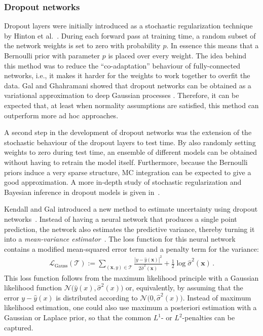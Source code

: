 \documentclass[smallcondensed]{svjour3}
\begin{document}
\subsubsection*{Dropout networks}

    Dropout layers were initially introduced as a stochastic regularization technique by Hinton et al.~\cite{srivastava2014dropout}. During each forward pass at training time, a random subset of the network weights is set to zero with probability $p$. In essence this means that a Bernoulli prior with parameter $p$ is placed over every weight. The idea behind this method was to reduce the ``co-adaptation'' behaviour of fully-connected networks, i.e., it makes it harder for the weights to work together to overfit the data. Gal and Ghahramani showed that dropout networks can be obtained as a variational approximation to deep Gaussian processes \cite{gal2016dropout}. Therefore, it can be expected that, at least when normality assumptions are satisfied, this method can outperform more ad hoc approaches.

    A second step in the development of dropout networks was the extension of the stochastic behaviour of the dropout layers to test time. By also randomly setting weights to zero during test time, an ensemble of different models can be obtained without having to retrain the model itself. Furthermore, because the Bernoulli priors induce a very sparse structure, MC integration can be expected to give a good approximation. A more in-depth study of stochastic regularization and Bayesian inference in dropout models is given in~\cite{gal2016uncertainty}.

    Kendall and Gal introduced a new method to estimate uncertainty using dropout networks~\cite{kendallgal}. Instead of having a neural network that produces a single point prediction, the network also estimates the predictive variance, thereby turning it into a \textit{mean-variance estimator}~\cite{khosravi2011comprehensive,nix1994estimating}. The loss function for this neural network contains a modified mean-squared error term and a penalty term for the variance:
    \begin{gather}
        \label{gaussian_score}
        \mathcal{L}_\text{Gauss}(\mathcal{T}) := \sum_{(\mathbf{x},y)\in\mathcal{T}}\frac{|y - \hat{y}(\mathbf{x})|^2}{2\hat{\sigma}^2(\mathbf{x})} + \frac{1}{2}\log\hat{\sigma}^2(\mathbf{x})\,.
    \end{gather}
    This loss function follows from the maximum likelihood principle with a Gaussian likelihood function $\mathcal{N}\big(\hat{y}(x),\hat{\sigma}^2(x)\big)$ or, equivalently, by assuming that the error $y-\hat{y}(x)$ is distributed according to $\mathcal{N}\big(0, \hat{\sigma}^2(x)\big)$. Instead of maximum likelihood estimation, one could also use maximum a posteriori estimation with a Gaussian or Laplace prior, so that the common $L^1$- or $L^2$-penalties can be captured.
\end{document}
